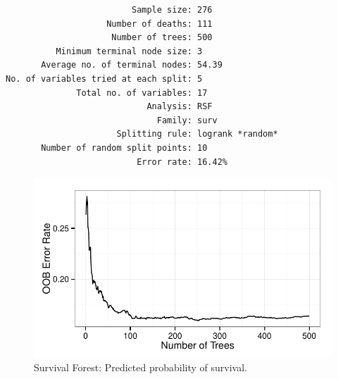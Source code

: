 \documentclass[nojss]{jss}\usepackage[]{graphicx}\usepackage[]{color}
\makeatletter
\def\maxwidth{ %
  \ifdim\Gin@nat@width>\linewidth
    \linewidth
  \else
    \Gin@nat@width
  \fi
}
\newenvironment{kframe}{%
 \def\at@end@of@kframe{}%
 \ifinner\ifhmode%
  \def\at@end@of@kframe{\end{minipage}}%
  \begin{minipage}{\columnwidth}%
 \fi\fi%
 \def\FrameCommand##1{\hskip\@totalleftmargin \hskip-\fboxsep
 \colorbox{shadecolor}{##1}\hskip-\fboxsep
     \hskip-\linewidth \hskip-\@totalleftmargin \hskip\columnwidth}%
 \MakeFramed {\advance\hsize-\width
   \@totalleftmargin\z@ \linewidth\hsize
   \@setminipage}}%
 {\par\unskip\endMakeFramed%
 \at@end@of@kframe}
\newenvironment{knitrout}{}{} %
\makeatother
\begin{document}

\begin{knitrout}\footnotesize
{}\color{fgcolor}\begin{kframe}
\begin{verbatim}
                         Sample size: 276
                    Number of deaths: 111
                     Number of trees: 500
          Minimum terminal node size: 3
       Average no. of terminal nodes: 54.39
No. of variables tried at each split: 5
              Total no. of variables: 17
                            Analysis: RSF
                              Family: surv
                      Splitting rule: logrank *random*
       Number of random split points: 10
                          Error rate: 16.42%
\end{verbatim}
\end{kframe}\begin{figure}[!htpb]


{\centering \includegraphics[width=\maxwidth]{figure/vig-surv-rf-error-1} 

}

\caption[Survival Forest]{Survival Forest: Predicted probability of survival.\label{fig:surv-rf-error}}
\end{figure}


\end{knitrout}
\end{document}
